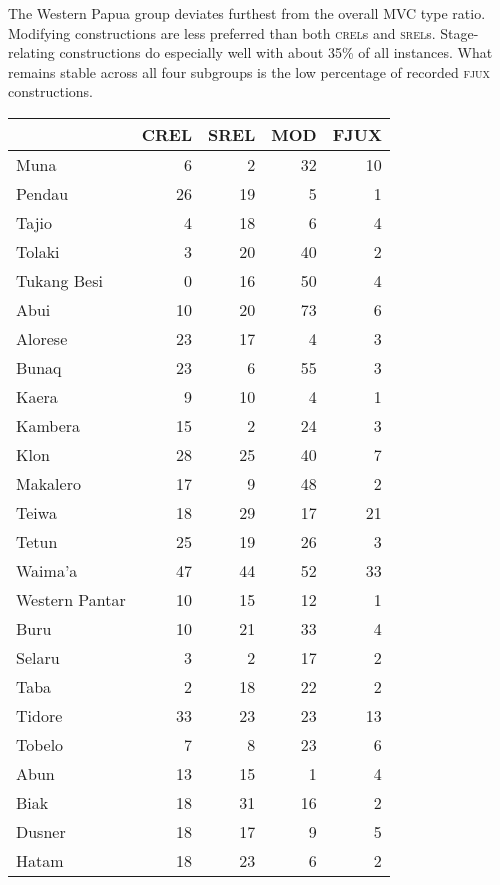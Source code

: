 The Western Papua group deviates furthest from the overall MVC type ratio. Modifying constructions are less preferred than both \textsc{crel}s and \textsc{srel}s. Stage-relating constructions do especially well with about 35\% of all instances. What remains stable across all four subgroups is the low percentage of recorded \textsc{fjux} constructions.

\begin{table}


\begin{tabular}{lrrrr}
  \lsptoprule
 & CREL & SREL & MOD & FJUX \\ 
  \hline
  Muna &   6 &   2 &  32  &   10  \\ 
  Pendau &  26 &  19 &   5  &   1  \\ 
  Tajio &   4 &  18 &   6  &   4  \\ 
  Tolaki &   3 &  20 &  40  &   2  \\ 
  Tukang Besi &   0 &  16 &  50   &   4 \\ \hline 
  Abui &  10 &  20 &  73  &   6  \\ 
  Alorese &  23 &  17 &   4  &   3  \\ 
  Bunaq &  23 &   6 &  55  &   3  \\ 
  Kaera &  9 &   10 &  4  &   1  \\ 
  Kambera &  15 &   2 &  24  &   3  \\ 
  Klon &  28 &  25 &  40  &   7  \\ 
  Makalero &  17 &   9 &  48  &   2  \\ 
  Teiwa &   18 &  29 &  17  &   21  \\ 
  Tetun &  25 &  19 &  26  &   3  \\ 
  Waima'a &  47 &  44 &  52  &  33  \\ 
  Western Pantar &  10 &  15 &  12  &   1  \\ \hline
  Buru & 10 & 21 & 33 & 4 \\
  Selaru &   3 &   2 &   17  &   2  \\ 
  Taba &   2 &  18 &  22  &   2  \\ 
  Tidore & 33 & 23 & 23 & 13 \\
  Tobelo &   7 &   8 &  23  &   6  \\ \hline
  Abun &  13 &  15 &   1  &   4  \\ 
  Biak &  18 &  31 &  16  &   2  \\ 
  Dusner &  18 &  17 &   9  &  5 \\ 
  Hatam &  18 &  23 &   6  &   2  \\ 

\end{tabular}
\end{table}
